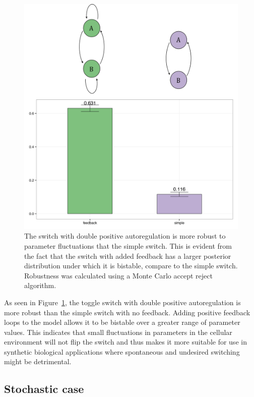 \begin{figure}[h]
\centering
\includegraphics[scale=0.5]{chapterModelling/images/MA_robustness_cartoon.png}
\caption[The robustness of the double positive and the simple switch mass action models]{The switch with double positive autoregulation is more robust to parameter fluctuations that the simple switch. This is evident from the fact that the switch with added feedback has a larger posterior distribution under which it is bistable, compare to the simple switch. Robustness was calculated using a Monte Carlo accept reject algorithm. }
\label{fig:robust_std_doubpos}
\end{figure}
As seen in Figure~\ref{fig:robust_std_doubpos}, the toggle switch with double positive autoregulation is more robust than the simple switch with no feedback. Adding positive feedback loops to the model allows it to be bistable over a greater range of parameter values. This indicates that small fluctuations in parameters in the cellular environment will not flip the switch and thus makes it more suitable for use in synthetic biological applications where spontaneous and undesired switching might be detrimental. 


\subsection{Stochastic case}
